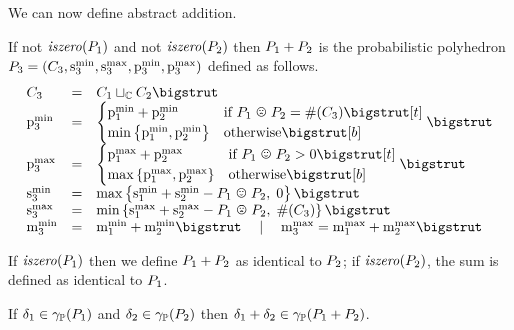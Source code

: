 We can now define abstract addition.

\begin{definition}
\label{def:pplus}
If not $ \mathit{iszero}(P_{1}) $ and not $ \mathit{iszero}(P_{2}) $ then $P_{1} + P_{2}$ is the probabilistic polyhedron $P_{3} = (C_{3},\mathrm{s}^\mathrm{min}_{3},\mathrm{s}^\mathrm{max}_{3},\mathrm{p}^\mathrm{min}_{3},\mathrm{p}^\mathrm{max}_{3})$ defined as follows.
\[
\begin{array}{lcl}
\getpoly{3} &=& \pa \pjoin \pb \bigstrut \\
\pmin{3} &=& 
\begin{cases}
\pmin{1} + \pmin{2} & \text{if } \pessoverlap{\ppa}{\ppb} = \psize{\getpoly{3}} \bigstrut[t] \\
\minparen{\pmin{1}, \pmin{2}} & \text{otherwise}\bigstrut[b] 
\end{cases} \bigstrut \\

\pmax{3} &=&
\begin{cases}
\pmax{1} + \pmax{2} & \text{if } \optoverlap{\ppa}{\ppb} > 0 \bigstrut[t] \\
\maxparen{\pmax{1}, \pmax{2}} & \text{otherwise}\bigstrut[b]
\end{cases} \bigstrut \\

\smin{3} &=& \maxparen{\smin{1} + \smin{2} - \optoverlap{\ppa}{\ppb},
  \; 0} \bigstrut \\

\smax{3} &=& \minparen{\smax{1} + \smax{2} - \pessoverlap{\ppa}{\ppb},
\; \psize{\getpoly{3}}} \bigstrut \\

\mmin{3} &=& \mmin{1} + \mmin{2} \bigstrut \quad \mid \quad
\mmax{3} = \mmax{1} + \mmax{2} \bigstrut  \\
\end{array}
\]

If $ \mathit{iszero}(P_{1})$ then we define $ P_{1} + P_{2} $ as identical 
to $ P_{2} $; if $ \mathit{iszero}(P_{2}) $, the sum is defined as
identical to $ P_{1} $. 
\end{definition}

\begin{lemma} \label{lem:pp:plus}
If $\delta_1 \in \gamma_{\mathbb{P}}(P_{1})$ and $\delta_2 \in \gamma_{\mathbb{P}}(P_{2})$ then $\delta_1 + \delta_2 \in \gamma_{\mathbb{P}}(P_{1} + P_{2})$.
\end{lemma}

